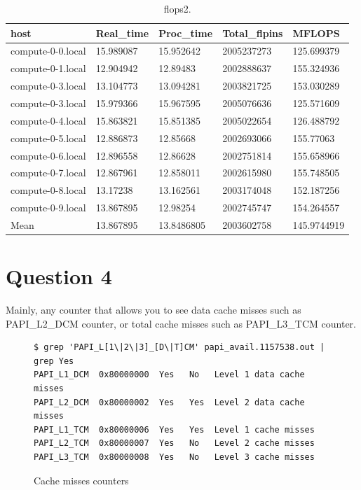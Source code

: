 \documentclass[12pt]{article}
\begin{document}
\begin{table}[h!]
	\centering
		\begin{tabular}{|l|l|l|l|l|}
			\hline
			host & Real\_time & Proc\_time & Total\_flpins & MFLOPS \\
			\hline
			compute-0-0.local & 15.989087 & 15.952642 & 2005237273 & 125.699379 \\
			compute-0-1.local & 12.904942 & 12.89483 & 2002888637 & 155.324936 \\
			compute-0-3.local & 13.104773 & 13.094281 & 2003821725 & 153.030289 \\
			compute-0-3.local & 15.979366 & 15.967595 & 2005076636 & 125.571609 \\
			compute-0-4.local & 15.863821 & 15.851385 & 2005022654 & 126.488792 \\
			compute-0-5.local & 12.886873 & 12.85668 & 2002693066 & 155.77063 \\
			compute-0-6.local & 12.896558 & 12.86628 & 2002751814 & 155.658966 \\
			compute-0-7.local & 12.867961 & 12.858011 & 2002615980 & 155.748505 \\
			compute-0-8.local & 13.17238 & 13.162561 & 2003174048 & 152.187256 \\
			compute-0-9.local & 13.867895 & 12.98254 & 2002745747 & 154.264557 \\
			\hline
			\hline
			Mean & 13.867895 & 13.8486805 & 2003602758 & 145.9744919 \\
			\hline			
		\end{tabular}
	\caption{flops2.}
	\label{tab:flops2}
\end{table}

\newpage

\section*{Question 4}

Mainly, any counter that allows you to see data cache misses such as PAPI\_L2\_DCM counter, or total cache misses such as PAPI\_L3\_TCM counter.

\begin{figure}[h!]
	\begin{verbatim}
$ grep 'PAPI_L[1\|2\|3]_[D\|T]CM' papi_avail.1157538.out | grep Yes
PAPI_L1_DCM  0x80000000  Yes   No   Level 1 data cache misses
PAPI_L2_DCM  0x80000002  Yes   Yes  Level 2 data cache misses
PAPI_L1_TCM  0x80000006  Yes   Yes  Level 1 cache misses
PAPI_L2_TCM  0x80000007  Yes   No   Level 2 cache misses
PAPI_L3_TCM  0x80000008  Yes   No   Level 3 cache misses
	\end{verbatim}
	\caption{Cache misses counters}\label{code:qflow}
\end{figure}
\end{document}
